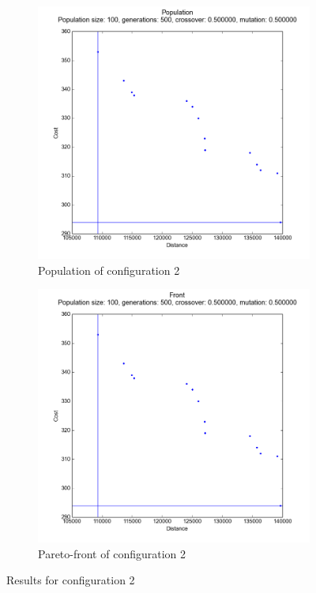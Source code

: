\documentclass[
]{article}
\begin{document}
\begin{figure}[H]
    \centering
    \begin{subfigure}[b]{0.45\textwidth}
        \includegraphics[width=\textwidth]{config-2-population.png}
        \caption{Population of configuration 2}
    \end{subfigure}
    \begin{subfigure}[b]{0.45\textwidth}
        \includegraphics[width=\textwidth]{config-2-front.png}
        \caption{Pareto-front of configuration 2}
    \end{subfigure}
    \caption{Results for configuration 2}
    \label{config-2}
\end{figure}
\end{document}
